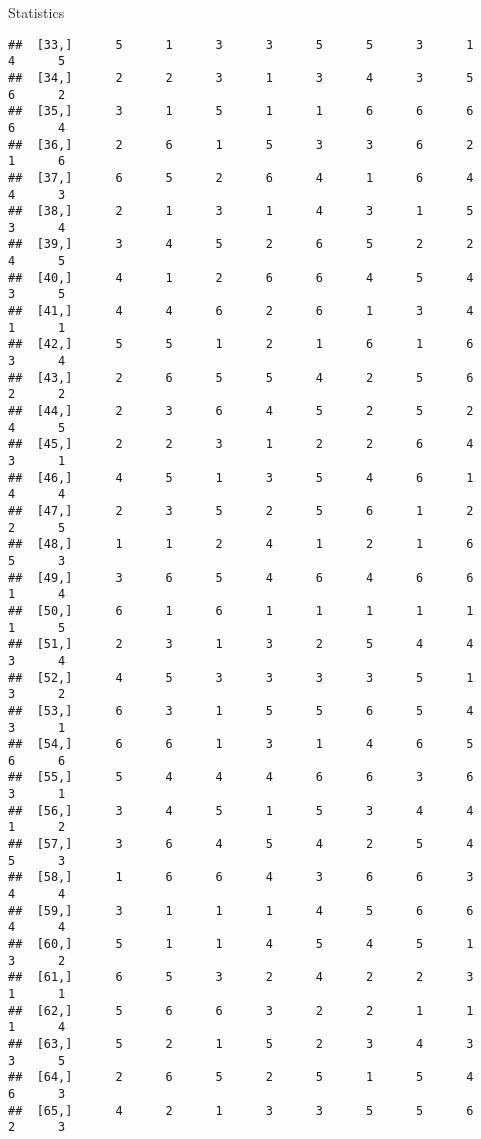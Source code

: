 \documentclass[
  ignorenonframetext,
]{beamer}
\begin{document}
\begin{frame}[fragile]{Statistics}
\begin{verbatim}
##  [33,]      5      1      3      3      5      5      3      1      4      5
##  [34,]      2      2      3      1      3      4      3      5      6      2
##  [35,]      3      1      5      1      1      6      6      6      6      4
##  [36,]      2      6      1      5      3      3      6      2      1      6
##  [37,]      6      5      2      6      4      1      6      4      4      3
##  [38,]      2      1      3      1      4      3      1      5      3      4
##  [39,]      3      4      5      2      6      5      2      2      4      5
##  [40,]      4      1      2      6      6      4      5      4      3      5
##  [41,]      4      4      6      2      6      1      3      4      1      1
##  [42,]      5      5      1      2      1      6      1      6      3      4
##  [43,]      2      6      5      5      4      2      5      6      2      2
##  [44,]      2      3      6      4      5      2      5      2      4      5
##  [45,]      2      2      3      1      2      2      6      4      3      1
##  [46,]      4      5      1      3      5      4      6      1      4      4
##  [47,]      2      3      5      2      5      6      1      2      2      5
##  [48,]      1      1      2      4      1      2      1      6      5      3
##  [49,]      3      6      5      4      6      4      6      6      1      4
##  [50,]      6      1      6      1      1      1      1      1      1      5
##  [51,]      2      3      1      3      2      5      4      4      3      4
##  [52,]      4      5      3      3      3      3      5      1      3      2
##  [53,]      6      3      1      5      5      6      5      4      3      1
##  [54,]      6      6      1      3      1      4      6      5      6      6
##  [55,]      5      4      4      4      6      6      3      6      3      1
##  [56,]      3      4      5      1      5      3      4      4      1      2
##  [57,]      3      6      4      5      4      2      5      4      5      3
##  [58,]      1      6      6      4      3      6      6      3      4      4
##  [59,]      3      1      1      1      4      5      6      6      4      4
##  [60,]      5      1      1      4      5      4      5      1      3      2
##  [61,]      6      5      3      2      4      2      2      3      1      1
##  [62,]      5      6      6      3      2      2      1      1      1      4
##  [63,]      5      2      1      5      2      3      4      3      3      5
##  [64,]      2      6      5      2      5      1      5      4      6      3
##  [65,]      4      2      1      3      3      5      5      6      2      3

\end{verbatim}
\end{frame}
\end{document}
